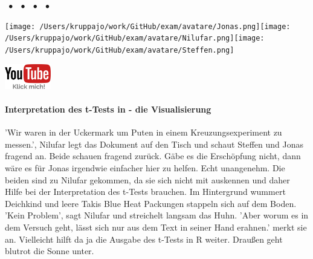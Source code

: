 \documentclass[a4paper, 9pt]{scrartcl}\usepackage[]{graphicx}\usepackage[]{xcolor}
\begin{document}
 
\ifcollection
\begin{flushright}
\tiny\vspace{-3Ex}
\textbf{\examinhaltstart}
\exammodulemathstat $\;\bullet$
\exammodulestat $\;\bullet$
\exammodulestatbbv $\;\bullet$
\exammodulestatversuch $\;\bullet$
\exammodulebiostat
\vspace{-4Ex}
\end{flushright}
\begin{minipage}[t]{0.5\textwidth}
\texttt{[image: /Users/kruppajo/work/GitHub/exam/avatare/Jonas.png]}\hspace{-4mm}\texttt{[image: /Users/kruppajo/work/GitHub/exam/avatare/Nilufar.png]}\hspace{-4mm}\texttt{[image: /Users/kruppajo/work/GitHub/exam/avatare/Steffen.png]}
\end{minipage}
\begin{minipage}[t]{0.5\textwidth}
\hfill
\href{https://youtu.be/02hibcRs5Wc}{\includegraphics[width = 2cm]{img/youtube}}
\end{minipage}
\fi



\ifcollection
\paragraph{Interpretation des t-Tests in \Rlogo - die Visualisierung}
\fi

'Wir waren in der Uckermark um Puten in einem Kreuzungsexperiment zu messen.', Nilufar legt das Dokument auf den Tisch und schaut Steffen und Jonas fragend an. Beide schauen fragend zurück. Gäbe es die Erschöpfung nicht, dann wäre es für Jonas irgendwie einfacher hier zu helfen. Echt unangenehm. Die beiden sind zu Nilufar gekommen, da sie sich nicht mit \Rlogo auskennen und daher Hilfe bei der Interpretation des t-Tests brauchen. Im Hintergrund wummert Deichkind und leere Takis Blue Heat Packungen stappeln sich auf dem Boden. 'Kein Problem', sagt Nilufar und streichelt langsam das Huhn. 'Aber worum es in dem Versuch geht, lässt sich nur aus dem Text in seiner Hand erahnen.' merkt sie an. Vielleicht hilft da ja die Ausgabe des t-Tests in R weiter. Draußen geht blutrot die Sonne unter.
\end{document}
